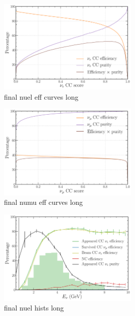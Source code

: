 \begin{figure} %
    \includegraphics[width=0.6\textwidth]{diagrams/6-cvn/chipsnet/final_nuel_eff_curves.pdf}
    \caption[final nuel eff curves short]
    {final nuel eff curves long}
    \label{fig:final_nuel_eff_curves}
\end{figure}

\begin{figure} %
    \includegraphics[width=0.6\textwidth]{diagrams/6-cvn/chipsnet/final_numu_eff_curves.pdf}
    \caption[final numu eff curves short]
    {final numu eff curves long}
    \label{fig:final_numu_eff_curves}
\end{figure}

\begin{figure} %
    \includegraphics[width=0.6\textwidth]{diagrams/6-cvn/chipsnet/final_nuel_hists.pdf}
    \caption[final nuel hists short]
    {final nuel hists long}
    \label{fig:final_nuel_hists}
\end{figure}

